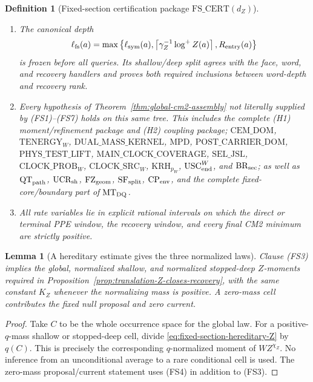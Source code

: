 \documentclass[11pt]{article}
\newtheorem{lemma}[theorem]{Lemma}
\newtheorem{definition}[theorem]{Definition}
\begin{document}
\begin{definition}[Fixed-section certification package
$\mathrm{FS\_CERT}(d_Z)$]
\begin{enumerate}[label=\textup{(FS\arabic*)}]
continuation and finite-frequency uniformity give \textup{(PPE3)--(PPE4)}
on the identical stopped tree.
\item The canonical depth
\begin{equation}
 \ell_{\rm fs}(a)=\max\left\{\ell_{\rm sym}(a),
 \left\lceil\gamma_Z^{-1}\log^+Z(a)\right\rceil,
 R_{\rm entry}(a)\right\}
\label{eq:fixed-section-canonical-depth}
\end{equation}
is frozen before all queries.  Its shallow/deep split agrees with the face,
word, and recovery handlers and proves both required inclusions between
word-depth and recovery rank.
\item \begin{flushleft}Every hypothesis of
Theorem~\ref{thm:global-cm2-assembly} not
literally supplied by \textup{(FS1)--(FS7)} holds on this same tree.  This
includes the complete \textup{(H1)} moment/refinement package and
\textup{(H2)} coupling package; $\mathrm{CEM\_DOM}$,
$\mathrm{TENERGY}_{W}$, $\mathrm{DUAL\_MASS\_KERNEL}$, $\mathrm{MPD}$,
$\mathrm{POST\_CARRIER\_DOM}$, $\mathrm{PHYS\_TEST\_LIFT}$,
$\mathrm{MAIN\_CLOCK\_COVERAGE}$, $\mathrm{SEL\_JSL}$,
$\mathrm{CLOCK\_PROB}_{W}$, $\mathrm{CLOCK\_SRC}_{W}$,
$\mathrm{KRH}_{p_W}$, $\mathrm{USC}_{\rm end}^{W}$, and
$\mathrm{BR}_{\rm sec}$; as well as $\mathrm{QT}_{\rm path}$,
$\mathrm{UCR}_{\rm sh}$, $\mathrm{FZ}_{\rm geom}$,
$\mathrm{SF}_{\rm split}$, $\mathrm{CP}_{\rm env}$, and the complete
fixed-core/boundary part of $\mathrm{MT}_{\rm DQ}$.
\end{flushleft}
\item All rate variables lie in explicit rational intervals on which the
direct or terminal PPE window, the recovery window, and every final CM2
minimum are strictly positive.
\end{enumerate}
\end{definition}

\begin{lemma}[A hereditary estimate gives the three normalized laws]
\label{lem:fixed-section-hereditary-Z}
Clause \textup{(FS3)} implies the global, normalized shallow, and normalized
stopped-deep $Z$-moments required in
Proposition~\ref{prop:translation-Z-closes-recovery}, with the same constant
$K_Z$ whenever the normalizing mass is positive.  A zero-mass cell contributes
the fixed null proposal and zero current.
\end{lemma}

\begin{proof}
Take $C$ to be the whole occurrence space for the global law.  For a
positive-$q$-mass shallow or stopped-deep cell, divide
\eqref{eq:fixed-section-hereditary-Z} by $q(C)$.  This is precisely the
corresponding $q$-normalized moment of $WZ^{\chi_Z}$.  No inference from an
unconditional average to a rare conditional cell is used.  The zero-mass
proposal/current statement uses \textup{(FS4)} in addition to
\textup{(FS3)}.
\end{proof}
\end{document}
